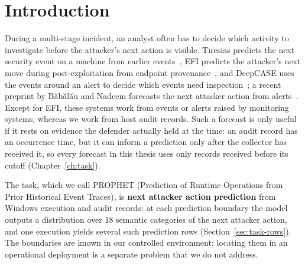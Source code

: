 \chapter{Introduction}
\label{ch:introduction}

During a multi-stage incident, an analyst often has to decide which
activity to investigate before the attacker's next action is visible.
Tiresias predicts the next security event on a machine from earlier
events~\cite{shen2018tiresias}, EFI predicts the attacker's next move
during post-exploitation from endpoint provenance~\cite{zhu2024nip},
and DeepCASE uses the events around an alert to decide which events
need inspection~\cite{vanede2022deepcase}; a recent preprint by
B\u{a}b\u{a}l\u{a}u and Nadeem forecasts the next attacker action from
alerts~\cite{babalau2024forecasting}. Except for EFI, these systems work from
events or alerts raised by monitoring systems, whereas we work from
host audit records. Such a forecast is only useful if it rests
on evidence the defender actually held at the time: an audit record has
an occurrence time, but it can inform a prediction only after the
collector has received it, so every forecast in this thesis uses only
records received before its cutoff (Chapter~\ref{ch:task}).

The task, which we call PROPHET (Prediction of Runtime Operations from
Prior Historical Event Traces), is \textbf{next attacker action prediction} from
Windows execution and audit records: at each prediction boundary the
model outputs a distribution over 18 semantic categories of the next
attacker action, and one execution yields several such prediction rows
(Section~\ref{sec:task-rows}). The boundaries are known in our controlled
environment; locating them in an operational deployment is a separate
problem that we do not address.

